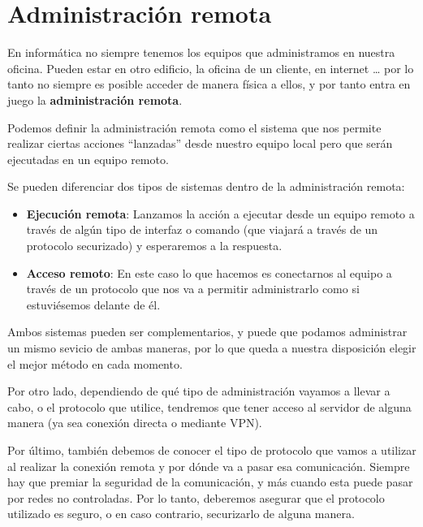 \chapter{Administración remota}

En informática no siempre tenemos los equipos que administramos en nuestra oficina. Pueden estar en otro edificio, la oficina de un cliente, en internet … por lo tanto no siempre es posible acceder de manera física a ellos, y por tanto entra en juego la \textbf{administración remota}.

Podemos definir la administración remota como el sistema que nos permite realizar ciertas acciones “lanzadas” desde nuestro equipo local pero que serán ejecutadas en un equipo remoto.

Se pueden diferenciar dos tipos de sistemas dentro de la administración remota:

\begin{itemize}
    \item \textbf{Ejecución remota}: Lanzamos la acción a ejecutar desde un equipo remoto a través de algún tipo de interfaz o comando (que viajará a través de un protocolo securizado) y esperaremos a la respuesta.

    \item \textbf{Acceso remoto}: En este caso lo que hacemos es conectarnos al equipo a través de un protocolo que nos va a permitir administrarlo como si estuviésemos delante de él.
\end{itemize}

Ambos sistemas pueden ser complementarios, y puede que podamos administrar un mismo sevicio de ambas maneras, por lo que queda a nuestra disposición elegir el mejor método en cada momento.

Por otro lado, dependiendo de qué tipo de administración vayamos a llevar a cabo, o el protocolo que utilice, tendremos que tener acceso al servidor de alguna manera (ya sea conexión directa o mediante VPN).


Por último, también debemos de conocer el tipo de protocolo que vamos a utilizar al realizar la conexión remota y por dónde va a pasar esa comunicación. Siempre hay que premiar la seguridad de la comunicación, y más cuando esta puede pasar por redes no controladas. Por lo tanto, deberemos asegurar que el protocolo utilizado es seguro, o en caso contrario, securizarlo de alguna manera.

